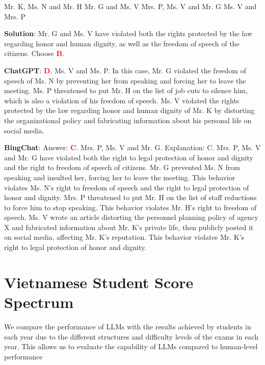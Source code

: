\documentclass{article}
\begin{document}
{\begin{mdframed}[linewidth=1pt,linecolor=red]
		\begin{choices}
			\choice Mr. K, Ms. N and Mr. H
			\choice Mr. G and Ms. V
			\choice Mrs. P, Ms. V and Mr. G 
			\choice Ms. V and Mrs. P
		\end{choices}
		
		\textbf{Solution}: Mr. G and Ms. V have violated both the rights protected by the law regarding honor and human dignity, as well as the freedom of speech of the citizens. Choose \textcolor{red}{\textbf{B}}. 
		
		\textbf{ChatGPT}: \textcolor{red}{\textbf{D}}. Ms. V and Ms. P. In this case, Mr. G violated the freedom of speech of Ms. N by preventing her from speaking and forcing her to leave the meeting. Ms. P threatened to put Mr. H on the list of job cuts to silence him, which is also a violation of his freedom of speech. Ms. V violated the rights protected by the law regarding honor and human dignity of Mr. K by distorting the organizational policy and fabricating information about his personal life on social media.
		
		\textbf{BingChat}: Answer: \textcolor{red}{\textbf{C}}. Mrs. P, Ms. V and Mr. G. Explanation: C. Mrs. P, Ms. V and Mr. G have violated both the right to legal protection of honor and dignity and the right to freedom of speech of citizens. Mr. G prevented Ms. N from speaking and insulted her, forcing her to leave the meeting. This behavior violates Ms. N’s right to freedom of speech and the right to legal protection of honor and dignity. Mrs. P threatened to put Mr. H on the list of staff reductions to force him to stop speaking. This behavior violates Mr. H’s right to freedom of speech. Ms. V wrote an article distorting the personnel planning policy of agency X and fabricated information about Mr. K’s private life, then publicly posted it on social media, affecting Mr. K’s reputation. This behavior violates Mr. K’s right to legal protection of honor and dignity.
		
	\end{mdframed}
	
	
	
	\newpage
		
	\section{Vietnamese Student Score Spectrum} 
	\label{sec:Score Spectrum}
	
	We compare the performance of LLMs with the results achieved by students in each year due to the different structures and difficulty levels of the exams in each year. This allows us to evaluate the capability of LLMs compared to human-level performance
	
}
\end{document}
